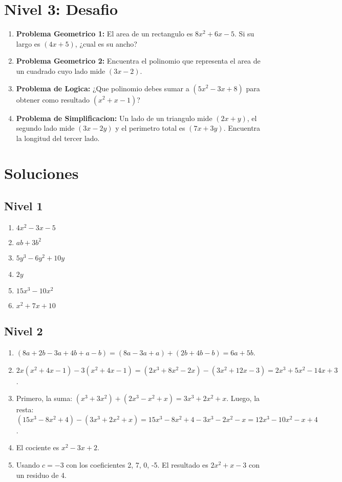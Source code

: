 \documentclass[12pt,a4paper]{article}
\begin{document}
\section*{Nivel 3: Desafio}
\begin{enumerate}
    \item \textbf{Problema Geometrico 1:} El area de un rectangulo es $8x^2 + 6x - 5$. Si su largo es $(4x+5)$, ¿cual es su ancho?
    \item \textbf{Problema Geometrico 2:} Encuentra el polinomio que representa el area de un cuadrado cuyo lado mide $(3x - 2)$.
    \item \textbf{Problema de Logica:} ¿Que polinomio debes sumar a $(5x^2 - 3x + 8)$ para obtener como resultado $(x^2 + x - 1)$? 
    \item \textbf{Problema de Simplificacion:} Un lado de un triangulo mide $(2x+y)$, el segundo lado mide $(3x-2y)$ y el perimetro total es $(7x+3y)$. Encuentra la longitud del tercer lado.
\end{enumerate}

\newpage

\section*{Soluciones}

\subsection*{Nivel 1}
\begin{enumerate}
    \item $4x^2 - 3x - 5$
    \item $ab + 3b^2$
    \item $5y^3 - 6y^2 + 10y$
    \item $2y$
    \item $15x^3 - 10x^2$
    \item $x^2 + 7x + 10$
\end{enumerate}

\subsection*{Nivel 2}
\begin{enumerate}
    \item $(8a + 2b - 3a + 4b + a - b) = (8a-3a+a) + (2b+4b-b) = 6a + 5b$.
    \item $2x(x^2+4x-1) -3(x^2+4x-1) = (2x^3+8x^2-2x) - (3x^2+12x-3) = 2x^3+5x^2-14x+3$.
    \item Primero, la suma: $(x^3+3x^2) + (2x^3-x^2+x) = 3x^3+2x^2+x$. Luego, la resta: $(15x^3-8x^2+4) - (3x^3+2x^2+x) = 15x^3-8x^2+4 - 3x^3-2x^2-x = 12x^3-10x^2-x+4$.
    \item El cociente es $x^2 - 3x + 2$.
    \item Usando $c=-3$ con los coeficientes 2, 7, 0, -5. El resultado es $2x^2 + x - 3$ con un residuo de 4.
\end{enumerate}
\end{document}
